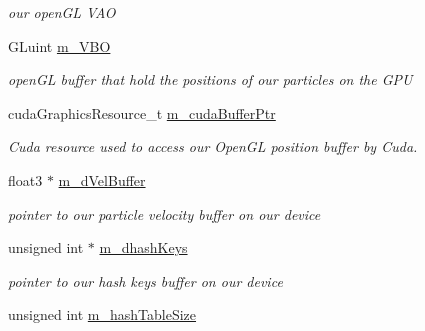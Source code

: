 \begin{DoxyCompactItemize}
\begin{DoxyCompactList}\small\item\em our open\-G\-L V\-A\-O \end{DoxyCompactList}\item 
\hypertarget{class_s_p_h_engine_a7bd9da54d4924eb97c8dda6cab2bd249}{G\-Luint \hyperlink{class_s_p_h_engine_a7bd9da54d4924eb97c8dda6cab2bd249}{m\-\_\-\-V\-B\-O}}\label{class_s_p_h_engine_a7bd9da54d4924eb97c8dda6cab2bd249}

\begin{DoxyCompactList}\small\item\em open\-G\-L buffer that hold the positions of our particles on the G\-P\-U \end{DoxyCompactList}\item 
\hypertarget{class_s_p_h_engine_a9f83c73c2df1b2472f1733c14cf3ea30}{cuda\-Graphics\-Resource\-\_\-t \hyperlink{class_s_p_h_engine_a9f83c73c2df1b2472f1733c14cf3ea30}{m\-\_\-cuda\-Buffer\-Ptr}}\label{class_s_p_h_engine_a9f83c73c2df1b2472f1733c14cf3ea30}

\begin{DoxyCompactList}\small\item\em Cuda resource used to access our Open\-G\-L position buffer by Cuda. \end{DoxyCompactList}\item 
\hypertarget{class_s_p_h_engine_a3cce64f08ed66cf93de0f6f0b4b5f2f6}{float3 $\ast$ \hyperlink{class_s_p_h_engine_a3cce64f08ed66cf93de0f6f0b4b5f2f6}{m\-\_\-d\-Vel\-Buffer}}\label{class_s_p_h_engine_a3cce64f08ed66cf93de0f6f0b4b5f2f6}

\begin{DoxyCompactList}\small\item\em pointer to our particle velocity buffer on our device \end{DoxyCompactList}\item 
\hypertarget{class_s_p_h_engine_ad68cedae42d547750a6d603faf005bf7}{unsigned int $\ast$ \hyperlink{class_s_p_h_engine_ad68cedae42d547750a6d603faf005bf7}{m\-\_\-dhash\-Keys}}\label{class_s_p_h_engine_ad68cedae42d547750a6d603faf005bf7}

\begin{DoxyCompactList}\small\item\em pointer to our hash keys buffer on our device \end{DoxyCompactList}\item 
\hypertarget{class_s_p_h_engine_acc7f76fa822e1f14cf8d5bd69f2eefb6}{unsigned int \hyperlink{class_s_p_h_engine_acc7f76fa822e1f14cf8d5bd69f2eefb6}{m\-\_\-hash\-Table\-Size}}\label{class_s_p_h_engine_acc7f76fa822e1f14cf8d5bd69f2eefb6}


\end{DoxyCompactItemize}
